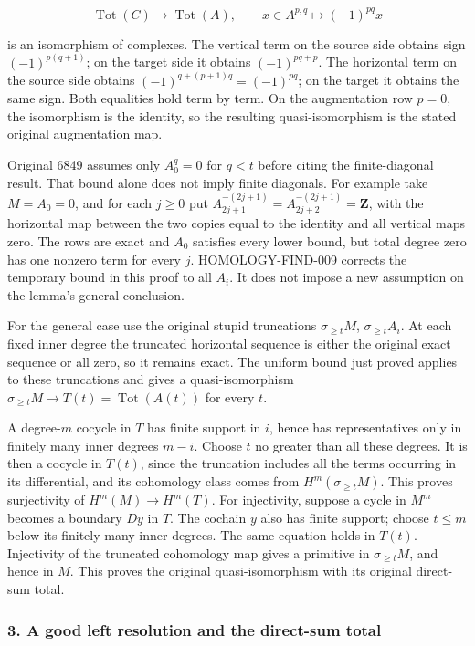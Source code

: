 \documentclass[11pt]{article}
\begin{document}
\[
\operatorname{Tot}(C)\longrightarrow\operatorname{Tot}(A),\qquad
x\in A^{p,q}\longmapsto(-1)^{pq}x
\]

is an isomorphism of complexes. The vertical term on the source side obtains sign \((-1)^{p(q+1)}\); on the target side it obtains \((-1)^{pq+p}\). The horizontal term on the source side obtains \((-1)^{q+(p+1)q}=(-1)^{pq}\); on the target it obtains the same sign. Both equalities hold term by term. On the augmentation row \(p=0\), the isomorphism is the identity, so the resulting quasi-isomorphism is the stated original augmentation map.

Original 6849 assumes only \(A_0^q=0\) for \(q<t\) before citing the finite-diagonal result. That bound alone does not imply finite diagonals. For example take \(M=A_0=0\), and for each \(j\geq0\) put \(A_{2j+1}^{-(2j+1)}=A_{2j+2}^{-(2j+1)}=\mathbf Z\), with the horizontal map between the two copies equal to the identity and all vertical maps zero. The rows are exact and \(A_0\) satisfies every lower bound, but total degree zero has one nonzero term for every \(j\). HOMOLOGY-FIND-009 corrects the temporary bound in this proof to all \(A_i\). It does not impose a new assumption on the lemma's general conclusion.

For the general case use the original stupid truncations \(\sigma_{\geq t}M\), \(\sigma_{\geq t}A_i\). At each fixed inner degree the truncated horizontal sequence is either the original exact sequence or all zero, so it remains exact. The uniform bound just proved applies to these truncations and gives a quasi-isomorphism \(\sigma_{\geq t}M\to T(t)=\operatorname{Tot}(A(t))\) for every \(t\).

A degree-\(m\) cocycle in \(T\) has finite support in \(i\), hence has representatives only in finitely many inner degrees \(m-i\). Choose \(t\) no greater than all these degrees. It is then a cocycle in \(T(t)\), since the truncation includes all the terms occurring in its differential, and its cohomology class comes from \(H^m(\sigma_{\geq t}M)\). This proves surjectivity of \(H^m(M)\to H^m(T)\). For injectivity, suppose a cycle in \(M^m\) becomes a boundary \(Dy\) in \(T\). The cochain \(y\) also has finite support; choose \(t\leq m\) below its finitely many inner degrees. The same equation holds in \(T(t)\). Injectivity of the truncated cohomology map gives a primitive in \(\sigma_{\geq t}M\), and hence in \(M\). This proves the original quasi-isomorphism with its original direct-sum total.

\subsubsection{3. A good left resolution and the direct-sum total}\label{a-good-left-resolution-and-the-direct-sum-total}
\end{document}
